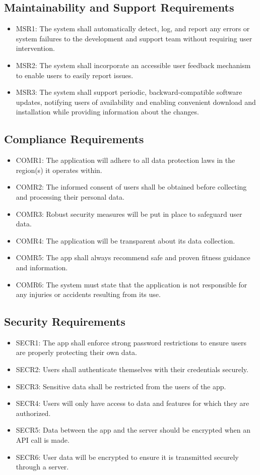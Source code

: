 \documentclass[12pt]{article}
\begin{document}
\subsection{Maintainability and Support Requirements}
\begin{itemize}
\item MSR1: The system shall automatically detect, log, and report any errors or system failures to the development and support team without requiring user intervention.
\item MSR2: The system shall incorporate an accessible user feedback mechanism to enable users to easily report issues.
\item MSR3: The system shall support periodic, backward-compatible software updates, notifying users of availability and enabling convenient download and installation while providing information about the changes.
\end{itemize}

\subsection{Compliance Requirements}
\begin{itemize}
\item COMR1: The application will adhere to all data protection laws in the region(s) it operates within.
\item COMR2: The informed consent of users shall be obtained before collecting and processing their personal data.
\item COMR3: Robust security measures will be put in place to safeguard user data.
\item COMR4: The application will be transparent about its data collection.
\item COMR5: The app shall always recommend safe and proven fitness guidance and information.
\item COMR6: The system must state that the application is not responsible for any injuries or accidents resulting from its use.
\end{itemize}

\subsection{Security Requirements}
\begin{itemize}
\item SECR1: The app shall enforce strong password restrictions to ensure users are properly protecting their own data.
\item SECR2: Users shall authenticate themselves with their credentials securely.
\item SECR3: Sensitive data shall be restricted from the users of the app.
\item SECR4: Users will only have access to data and features for which they are authorized.
\item SECR5: Data between the app and the server should be encrypted when an API call is made.
\item SECR6: User data will be encrypted to ensure it is transmitted securely through a server.
\end{itemize}
\end{document}
